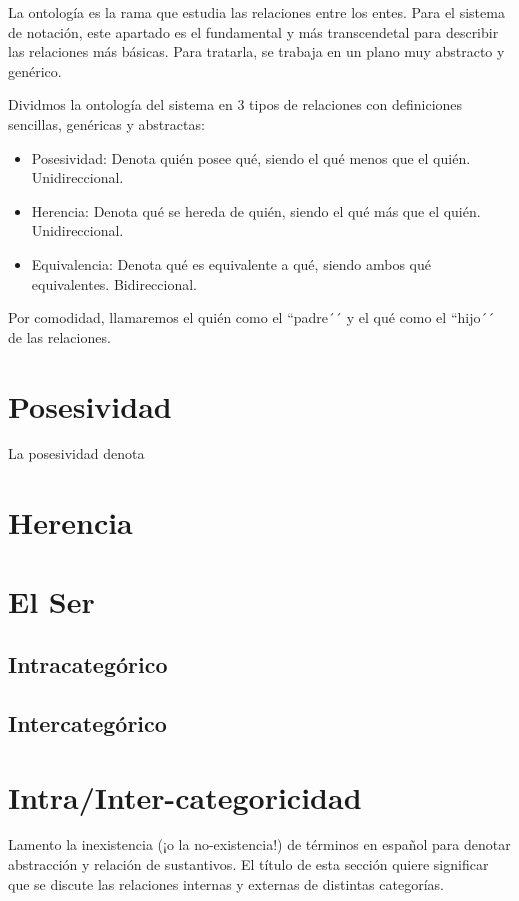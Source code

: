 \documentclass[12pt]{report}
\begin{document}
	
	La ontología es la rama que estudia las relaciones entre los entes. Para el sistema de notación, este apartado es el fundamental y más transcendetal para describir las relaciones más básicas. Para tratarla, se trabaja en un plano muy abstracto y genérico.
	
	Dividmos la ontología del sistema en 3 tipos de relaciones con definiciones sencillas, genéricas y abstractas:
	\begin{itemize}
		\item Posesividad: Denota quién posee qué, siendo el qué menos que el quién. Unidireccional.
		\item Herencia: Denota qué se hereda de quién, siendo el qué más que el quién. Unidireccional.
		\item Equivalencia: Denota qué es equivalente a qué, siendo ambos qué equivalentes. Bidireccional.
	\end{itemize}
	
	Por comodidad, llamaremos el quién como el ``padre´´ y el qué como el ``hijo´´ de las relaciones.
	
	\section{Posesividad}
	La posesividad denota
	
	\section{Herencia}
	\section{El Ser}
	\subsection{Intracategórico}
	\subsection{Intercategórico}
	\section{Intra/Inter-categoricidad}
	Lamento la inexistencia (¡o la no-existencia!) de términos en español para denotar abstracción y relación de sustantivos. El título de esta sección quiere significar que se discute las relaciones internas y externas de distintas categorías.
	
\end{document}
